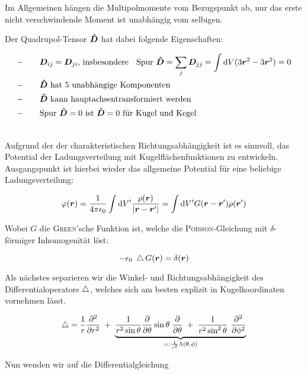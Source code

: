 Im Allgemeinen hängen die Multipolmomente vom Bezugspunkt ab, nur das erste nicht verschwindende Moment ist unabhängig vom selbigen.

Der Quadrupol-Tensor $\bm{\hat{D}}$ hat dabei folgende Eigenschaften:

\begin{align*}
- \qquad & \bm{D}_{ij} = \bm{D}_{ji}\text{, insbesondere } \; \text{ Spur } \bm{\hat{D}} = \sum_j \bm{D}_{jj} = \int\mathrm{d} V (3\bm{r}^2 - 3\bm{r}^2)=0 \\
- \qquad & \bm{\hat{D}} \text{ hat 5 unabhängige Komponenten}\\
- \qquad & \bm{\hat{D}} \text{ kann hauptachsentransformiert werden}\\
- \qquad & \text{Spur } \bm{\hat{D}} =0 \text{ ist } \bm{\hat{D}}=0 \text{ für Kugel und Kegel}
\end{align*}

\ \\

Aufgrund der der charakteristischen Richtungsabhängigkeit ist es sinnvoll, das Potential der Ladungsverteilung mit Kugelflächenfunktionen zu entwickeln. Ausgangspunkt ist hierbei wieder das allgemeine Potential für eine beliebige Ladungsverteilung: 

\begin{equation*}
\varphi(\bm{r}) = \frac{1}{4\pi\epsilon_0}\int\mathrm{d} V' \frac{\rho(\bm{r})}{|\bm{r}-\bm{r}'|} = \int\mathrm{d} V' G(\bm{r}-\bm{r}')\rho(\bm{r}')
\end{equation*}

Wobei $G$ die \textsc{Green}'sche Funktion ist, welche die \textsc{Poisson}-Gleichung mit $\delta$-förmiger Inhomogenität löst:

\begin{equation*}
-\epsilon_0 \ \mathop{{}\bigtriangleup}\nolimits G(\bm{r}) = \delta(\bm{r})
\end{equation*}

Als nächstes separieren wir die Winkel- und Richtungsabhängigkeit des Differentialoperators $\mathop{{}\bigtriangleup}\nolimits$, welches sich am besten explizit in Kugelkoordinaten vornehmen lässt.

\begin{equation*}
\laplace = \frac{1}{r} \pddiff{}{r}  \; +\; \underbrace{\frac{1}{r^2 \sin\theta} \pdiff{}{\theta} \sin\theta \; \pdiff{}{\theta} \; + \; \frac{1}{r^2 \sin^2\theta} \ \pddiff{}{\phi}}_{=: \frac{1}{r^2}\Lambda(\theta,\phi)}
\end{equation*}

Nun wenden wir auf die Differentialgleichung

